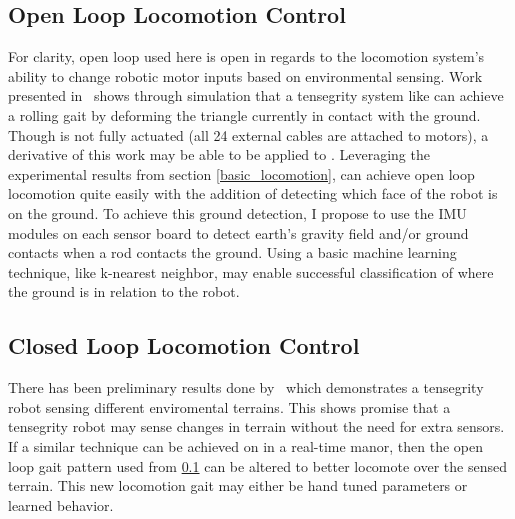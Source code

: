 \subsection{Open Loop Locomotion Control}
\label{open_loop}
For clarity, open loop used here is open in regards to the locomotion system's ability to change robotic motor inputs based on environmental sensing.
Work presented in~\cite{iscen2014flop} shows through simulation that a tensegrity system like \SB{} can achieve a rolling gait by deforming the triangle currently in contact with the ground.
Though \SB{} is not fully actuated (all 24 external cables are attached to motors), a derivative of this work may be able to be applied to \SB{}.
Leveraging the experimental results from section \ref{basic_locomotion}, \SB{} can achieve open loop locomotion quite easily with the addition of detecting which face of the robot is on the ground.
To achieve this ground detection, I propose to use the IMU modules on each sensor board to detect earth's gravity field and/or ground contacts when a rod contacts the ground.
Using a basic machine learning technique, like k-nearest neighbor, may enable successful classification of where the ground is in relation to the robot.

\subsection{Closed Loop Locomotion Control}
There has been preliminary results done by~\cite{burms2015online} which demonstrates a tensegrity robot sensing different enviromental terrains.
This shows promise that a tensegrity robot may sense changes in terrain without the need for extra sensors.
If a similar technique can be achieved on \SB{} in a real-time manor, then the open loop gait pattern used from \ref{open_loop} can be altered to better locomote over the sensed terrain.
This new locomotion gait may either be hand tuned parameters or learned behavior.

